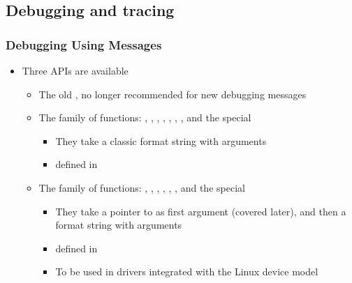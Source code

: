 \subsection{Debugging and tracing}

\begin{frame}
  \frametitle{Debugging Using Messages}
  \begin{itemize}
  \item Three APIs are available
    \begin{itemize}
    \item The old , no longer recommended for new debugging
      messages
    \item The  family of functions: ,
      , , ,
      , , ,
       and the special 
      \begin{itemize}
      \item They take a classic format string with arguments
      \item defined in 
      \end{itemize}
    \item The  family of functions: ,
      , , ,
      , ,  and
      the special 
      \begin{itemize}
      \item They take a pointer to  as first
        argument (covered later), and then a format string with
        arguments
      \item defined in 
      \item To be used in drivers integrated with the Linux device
        model
      \end{itemize}
    \end{itemize}
  \end{itemize}
\end{frame}

